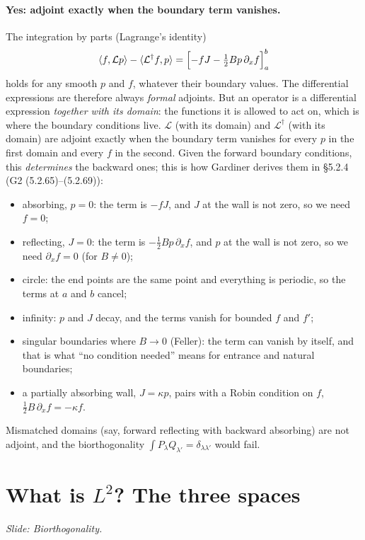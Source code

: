 \documentclass[11pt]{article}
\newcommand{\Lop}{\mathcal{L}}
\begin{document}
\paragraph{Yes: adjoint exactly when the boundary term vanishes.} The integration by parts (Lagrange's identity)
\[
  \langle f,\Lop p\rangle-\langle\Lop^\dagger f,p\rangle=\Bigl[-fJ-\tfrac12Bp\,\partial_xf\Bigr]_a^b
\]
holds for any smooth $p$ and $f$, whatever their boundary values. The differential expressions are therefore always
\emph{formal} adjoints. But an operator is a differential expression \emph{together with its domain}: the functions it is
allowed to act on, which is where the boundary conditions live. $\Lop$ (with its domain) and $\Lop^\dagger$ (with
its domain) are adjoint exactly when the boundary term vanishes for every $p$ in the first domain and every $f$ in the
second. Given the forward boundary conditions, this \emph{determines} the backward ones; this is how Gardiner derives
them in \S5.2.4 (G2 (5.2.65)--(5.2.69)):
\begin{itemize}
  \item absorbing, $p=0$: the term is $-fJ$, and $J$ at the wall is not zero, so we need $f=0$;
  \item reflecting, $J=0$: the term is $-\frac12Bp\,\partial_xf$, and $p$ at the wall is not zero, so we need
        $\partial_xf=0$ (for $B\neq0$);
  \item circle: the end points are the same point and everything is periodic, so the terms at $a$ and $b$ cancel;
  \item infinity: $p$ and $J$ decay, and the terms vanish for bounded $f$ and $f'$;
  \item singular boundaries where $B\to0$ (Feller): the term can vanish by itself, and that is what ``no condition
        needed'' means for entrance and natural boundaries;
  \item a partially absorbing wall, $J=\kappa p$, pairs with a Robin condition on $f$, $\frac12B\,\partial_xf=-\kappa f$.
\end{itemize}
Mismatched domains (say, forward reflecting with backward absorbing) are not adjoint, and the biorthogonality
$\int P_\lambda Q_{\lambda'}=\delta_{\lambda\lambda'}$ would fail.

\section{What is \texorpdfstring{$L^2$}{L2}? The three spaces}
\emph{Slide: Biorthogonality.}
\end{document}
